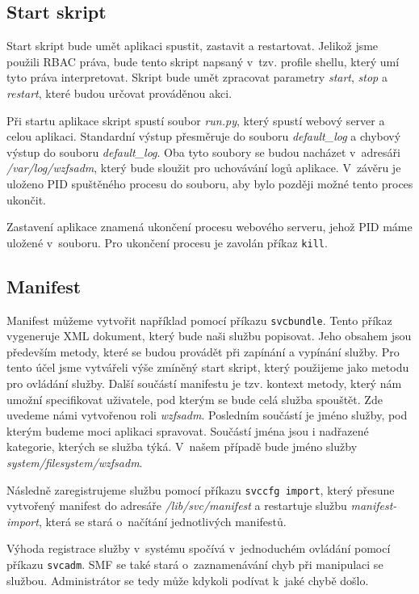 \subsection{Start skript}
Start skript bude umět aplikaci spustit, zastavit a restartovat. Jelikož jsme použili RBAC práva, bude tento skript napsaný v~tzv. profile shellu, který umí tyto práva interpretovat. Skript bude umět zpracovat parametry \emph{start}, \emph{stop} a \emph{restart}, které budou určovat prováděnou akci.

Při startu aplikace skript spustí soubor \emph{run.py}, který spustí webový server a celou aplikaci. Standardní výstup přesměruje do souboru \emph{default\_log} a chybový výstup do souboru \emph{default\_log}. Oba tyto soubory se budou nacházet v~adresáři \emph{/var/log/wzfsadm}, který bude sloužit pro uchovávání logů aplikace. V~závěru je uloženo PID spuštěného procesu do souboru, aby bylo později možné tento proces ukončit.

Zastavení aplikace znamená ukončení procesu webového serveru, jehož PID máme uložené v~souboru. Pro ukončení procesu je zavolán příkaz \verb|kill|.
\subsection{Manifest}
Manifest můžeme vytvořit například pomocí příkazu \verb|svcbundle|. Tento příkaz vygeneruje XML dokument, který bude naši službu popisovat. Jeho obsahem jsou především metody, které se budou provádět při zapínání a vypínání služby. Pro tento účel jsme vytvářeli výše zmíněný start skript, který použijeme jako metodu pro ovládání služby. Další součástí manifestu je tzv. kontext metody, který nám umožní specifikovat uživatele, pod kterým se bude celá služba spouštět. Zde uvedeme námi vytvořenou roli \emph{wzfsadm}. Posledním součástí je jméno služby, pod kterým budeme moci aplikaci spravovat. Součástí jména jsou i nadřazené kategorie, kterých se služba týká. V~našem případě bude jméno služby \emph{system/\-filesystem/\-wzfsadm}.

Následně zaregistrujeme službu pomocí příkazu \verb|svccfg import|, který přesune vytvořený manifest do adresáře \emph{/lib/\-svc/\-manifest} a restartuje službu \emph{manifest-import}, která se stará o~načítání jednotlivých manifestů.

Výhoda registrace služby v~systému spočívá v~jednoduchém ovládání pomocí příkazu \verb|svcadm|. SMF se také stará o~zaznamenávání chyb při manipulaci se službou. Administrátor se tedy může kdykoli podívat k~jaké chybě došlo.
